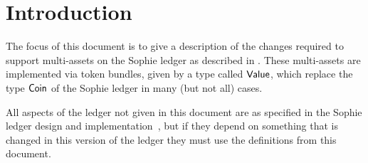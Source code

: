 \section{Introduction}

The focus of this document is to give a description of the changes
required to support multi-assets on the Sophie ledger as described in
\cite{utxo_ma}. These multi-assets are implemented via token bundles,
given by a type called $\mathsf{Value}$, which replace the type $\mathsf{Coin}$ of the
Sophie ledger in many (but not all) cases.

All aspects of the ledger not given in this document are as specified
in the Sophie ledger design and implementation~\cite{sophie_spec},
but if they depend on something that is changed in this version of the
ledger they must use the definitions from this document.
